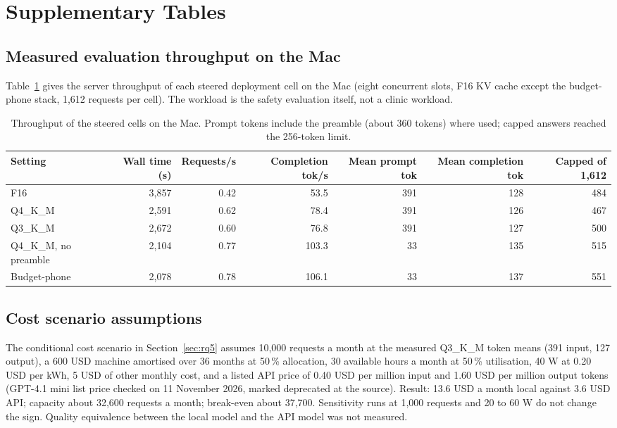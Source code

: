 \appendix
\section{Supplementary Tables}\label{app:tables}

\subsection{Measured evaluation throughput on the Mac}
Table~\ref{tab:throughput} gives the server throughput of each steered deployment cell on the Mac (eight concurrent slots, F16 KV cache except the budget-phone stack, 1,612 requests per cell). The workload is the safety evaluation itself, not a clinic workload.

\begin{table}[htbp]
\centering
\caption{Throughput of the steered cells on the Mac. Prompt tokens include the preamble (about 360 tokens) where used; capped answers reached the 256-token limit.}\label{tab:throughput}
\scriptsize
\begin{adjustbox}{max width=1.3\linewidth,center}
\begin{tabular}{lrrrrrr}
\toprule
Setting & Wall time (s) & Requests/s & Completion tok/s & Mean prompt tok & Mean completion tok & Capped of 1,612 \\
\midrule
F16 & 3,857 & 0.42 & 53.5 & 391 & 128 & 484 \\
Q4\_K\_M & 2,591 & 0.62 & 78.4 & 391 & 126 & 467 \\
Q3\_K\_M & 2,672 & 0.60 & 76.8 & 391 & 127 & 500 \\
Q4\_K\_M, no preamble & 2,104 & 0.77 & 103.3 & 33 & 135 & 515 \\
Budget-phone & 2,078 & 0.78 & 106.1 & 33 & 137 & 551 \\
\bottomrule
\end{tabular}
\end{adjustbox}
\end{table}

\subsection{Cost scenario assumptions}
The conditional cost scenario in Section~\ref{sec:rq5} assumes 10,000 requests a month at the measured Q3\_K\_M token means (391 input, 127 output), a 600 USD machine amortised over 36 months at 50\,\% allocation, 30 available hours a month at 50\,\% utilisation, 40 W at 0.20 USD per kWh, 5 USD of other monthly cost, and a listed API price of 0.40 USD per million input and 1.60 USD per million output tokens (GPT-4.1 mini list price checked on 11 November 2026, marked deprecated at the source). Result: 13.6 USD a month local against 3.6 USD API; capacity about 32,600 requests a month; break-even about 37,700. Sensitivity runs at 1,000 requests and 20 to 60 W do not change the sign. Quality equivalence between the local model and the API model was not measured.

